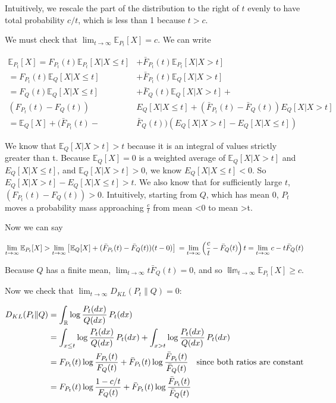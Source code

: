 \documentclass{article}
\begin{document}
Intuitively, we rescale the part of the distribution to the right of
\(t\) evenly to have total probability \(c/t\), which is less than 1
because \(t > c\).

We must check that \(\lim_{t \to \infty} \mathbb E_{P_t}[X] = c\). We
can write

\begin{align*} \mathbb E_{P_t}[X] = F_{P_t}(t) \mathbb E_{P_t}[X | X \le t] &+ \bar F_{P_t}(t) \mathbb E_{P_t}[X | X > t]    \\ = F_{P_t}(t) \mathbb E_Q[X | X \le t] &+ \bar F_{P_t}(t) \mathbb E_Q[X | X > t]    \\ = F_Q(t) \mathbb E_Q[X | X \le t] &+ \bar F_Q(t) \mathbb E_Q[X | X > t] + \\ (F_{P_t}(t) - F_Q(t))&E_Q[X | X \le t] + (\bar F_{P_t}(t) - \bar F_Q(t)) E_Q[X | X > t]     \\ = \mathbb E_Q[X] + (\bar F_{P_t}(t) - &\bar F_Q(t))(E_Q[X | X > t] - E_Q[X | X \le t])
\end{align*}

We know that \(\mathbb E_Q[X | X > t] > t\) because it is an integral of
values strictly greater than t. Because \(\mathbb E_Q[X] = 0\) is a
weighted average of \(\mathbb E_Q[X|X>t]\) and \(E_Q[X | X \le t]\), and
\(\mathbb E_Q[X|X>t] > 0\), we know \(E_Q[X | X \le t] < 0\). So
\(E_Q[X | X > t] - E_Q[X | X \le t] > t.\) We also know that for
sufficiently large \(t\), \((F_{P_t}(t) - F_Q(t)) > 0\). Intuitively,
starting from \(Q\), which has mean 0, \(P_t\) moves a probability mass
approaching \(\frac c t\) from mean \textless0 to mean \textgreater t.

Now we can say

\[
\lim_{t \to \infty} \mathbb E_{P_t}[X] > \lim_{t \to \infty}\left[ \mathbb E_Q[X] + (\bar F_{P_t}(t) - \bar F_Q(t))(t-0) \right]
\\ = \lim_{t \to \infty}\left( \frac c t - \bar F_Q(t) \right) t = \lim_{t \to \infty}c - t \bar F_Q(t)
\]

Because \(Q\) has a finite mean,
\(\lim_{t \to \infty} t \bar F_Q(t) = 0\), and so
\(\mathbb \lim_{t \to \infty} \mathbb E_{P_t}[X] \ge c\).

Now we check that \(\lim_{t \to \infty} D_{KL}(P_t \| Q) = 0\):

\begin{align*}D_{KL}({P_t} \| Q) &= \int_{\mathbb R} \log \frac{{P_t}(dx)}{Q(dx)} \,{P_t}(dx)\\&= \int_{x \le t} \log \frac{{P_t}(dx)}{Q(dx)} \,{P_t}(dx) + \int_{x > t} \log \frac{{P_t}(dx)}{Q(dx)} \,{P_t}(dx)\\ &= F_{P_t}(t) \log \frac{F_{P_t}(t)}{F_Q(t)} + \bar F_{P_t}(t) \log \frac{\bar F_{P_t}(t)}{\bar F_Q(t)} \text{\quad since both ratios are constant}\\ &= F_{P_t}(t) \log \frac{1 - c/t}{F_Q(t)} + \bar F_{P_t}(t) \log \frac{\bar F_{P_t}(t)}{\bar F_Q(t)}\end{align*}
\end{document}
